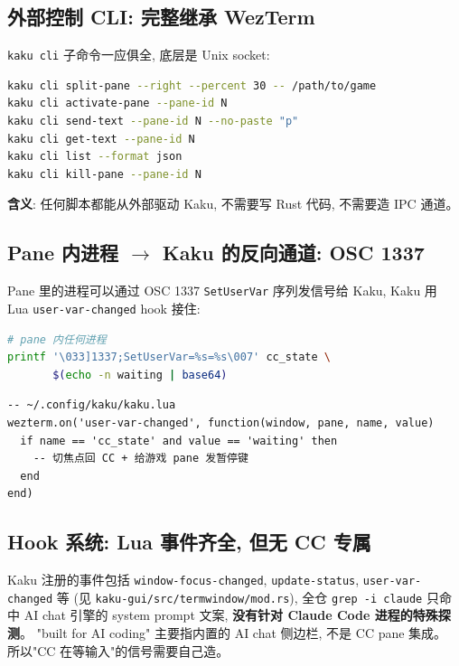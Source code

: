 \documentclass[11pt]{article}
\begin{document}
\subsection{外部控制 CLI: 完整继承 WezTerm}

\texttt{kaku cli} 子命令一应俱全, 底层是 Unix socket:

\begin{lstlisting}[language=bash]
kaku cli split-pane --right --percent 30 -- /path/to/game
kaku cli activate-pane --pane-id N
kaku cli send-text --pane-id N --no-paste "p"
kaku cli get-text --pane-id N
kaku cli list --format json
kaku cli kill-pane --pane-id N
\end{lstlisting}

\textbf{含义}: 任何脚本都能从外部驱动 Kaku, 不需要写 Rust 代码, 不需要造 IPC 通道。

\subsection{Pane 内进程 $\to$ Kaku 的反向通道: OSC 1337}

Pane 里的进程可以通过 OSC 1337 \texttt{SetUserVar} 序列发信号给 Kaku,
Kaku 用 Lua \texttt{user-var-changed} hook 接住:

\begin{lstlisting}[language=bash]
# pane 内任何进程
printf '\033]1337;SetUserVar=%s=%s\007' cc_state \
       $(echo -n waiting | base64)
\end{lstlisting}

\begin{lstlisting}[language={[5.2]Lua}]
-- ~/.config/kaku/kaku.lua
wezterm.on('user-var-changed', function(window, pane, name, value)
  if name == 'cc_state' and value == 'waiting' then
    -- 切焦点回 CC + 给游戏 pane 发暂停键
  end
end)
\end{lstlisting}

\subsection{Hook 系统: Lua 事件齐全, 但无 CC 专属}

Kaku 注册的事件包括 \texttt{window-focus-changed}, \texttt{update-status},
\texttt{user-var-changed} 等 (见 \texttt{kaku-gui/src/termwindow/mod.rs}),
全仓 \texttt{grep -i claude} 只命中 AI chat 引擎的 system prompt 文案,
\textbf{没有针对 Claude Code 进程的特殊探测}。
"built for AI coding" 主要指内置的 AI chat 侧边栏, 不是 CC pane 集成。
所以"CC 在等输入"的信号需要自己造。
\end{document}
